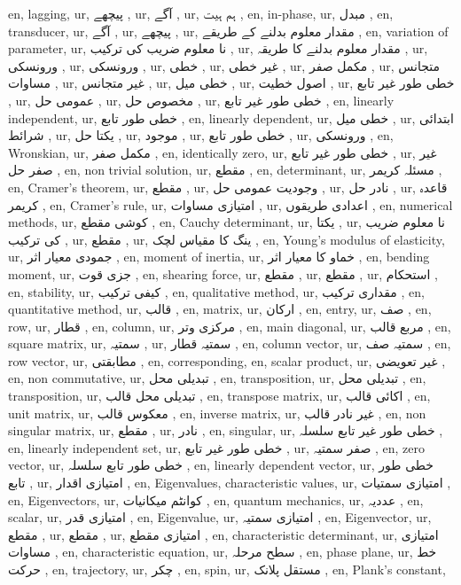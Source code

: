 en, lagging,
ur, پیچھے ,
ur, آگے ,
ur, ہم ہیت ,
en, in-phase,
ur, مبدل ,
en, transducer,
ur, آگے ,
ur, پیچھے ,
ur, مقدار معلوم بدلنے کے طریقے ,
en, variation of parameter,
ur, نا معلوم ضریب کی ترکیب ,
ur, مقدار معلوم بدلنے کا طریقہ ,
ur, ورونسکی ,
ur, ورونسکی ,
ur, خطی ,
ur, غیر خطی ,
ur, مکمل صفر ,
ur, متجانس مساوات ,
ur, غیر متجانس ,
ur, خطی میل ,
ur, اصول خطیت ,
ur, خطی طور غیر تابع ,
ur, عمومی حل ,
ur, مخصوص حل ,
ur, خطی طور غیر تابع ,
en, linearly independent,
ur, خطی طور تابع ,
en, linearly dependent,
ur, خطی میل ,
ur, ابتدائی شرائط ,
ur, یکتا حل ,
ur, موجود ,
ur, خطی طور تابع ,
ur, ورونسکی ,
en, Wronskian,
ur, مکمل صفر ,
en, identically zero,
ur, خطی طور غیر تابع ,
ur, غیر صفر حل ,
en, non trivial solution,
ur, مقطع ,
en, determinant,
ur, مسئلہ کریمر ,
en, Cramer's theorem,
ur, مقطع ,
ur, وجودیت عمومی حل ,
ur, نادر حل ,
ur, قاعدہ کریمر ,
en, Cramer's rule,
ur, امتیازی مساوات ,
ur, اعدادی طریقوں ,
en, numerical methods,
ur, کوشی مقطع ,
en, Cauchy determinant,
ur, یکتا ,
ur, نا معلوم ضریب کی ترکیب ,
ur, مقطع ,
ur, ینگ کا مقیاس لچک ,
en, Young's modulus of elasticity,
ur, جمودی معیار اثر ,
en, moment of inertia,
ur, خماو کا معیار اثر ,
en, bending moment,
ur, جزی قوت ,
en, shearing force,
ur, مقطع ,
ur, مقطع ,
ur, استحکام ,
en, stability,
ur, کیفی ترکیب ,
en, qualitative method,
ur, مقداری ترکیب ,
en, quantitative method,
ur, قالب ,
en, matrix,
ur, ارکان ,
en, entry,
ur, صف ,
en, row,
ur, قطار ,
en, column,
ur, مرکزی وتر ,
en, main diagonal,
ur, مربع قالب ,
en, square matrix,
ur, سمتیہ ,
ur, سمتیہ قطار ,
en, column vector,
ur, سمتیہ صف ,
en, row vector,
ur, مطابقتی ,
en, corresponding,
en, scalar product,
ur, غیر تعویضی ,
en, non commutative,
ur, تبدیلی محل ,
en, transposition,
ur, تبدیلی محل ,
en, transposition,
ur, تبدیلی محل قالب ,
en, transpose matrix,
ur, اکائی قالب ,
en, unit matrix,
ur, معکوس قالب ,
en, inverse matrix,
ur, غیر نادر قالب ,
en, non singular matrix,
ur, مقطع ,
ur, نادر ,
en, singular,
ur, خطی طور غیر تابع سلسلہ ,
en, linearly independent set,
ur, خطی طور غیر تابع ,
ur, صفر سمتیہ ,
en, zero vector,
ur, خطی طور تابع سلسلہ ,
en, linearly dependent vector,
ur, خطی طور تابع ,
ur, امتیازی اقدار ,
en, Eigenvalues, characteristic values,
ur, امتیازی سمتیات ,
en, Eigenvectors,
ur, کوانٹم میکانیات ,
en, quantum mechanics,
ur, عددیہ ,
en, scalar,
ur, امتیازی قدر ,
en, Eigenvalue,
ur, امتیازی سمتیہ ,
en, Eigenvector,
ur, مقطع ,
ur, مقطع ,
ur, امتیازی مقطع ,
en, characteristic determinant,
ur, امتیازی مساوات ,
en, characteristic equation,
ur, سطح مرحلہ ,
en, phase plane,
ur, خط حرکت ,
en, trajectory,
ur, چکر ,
en, spin,
ur, مستقل پلانک ,
en, Plank's constant,
